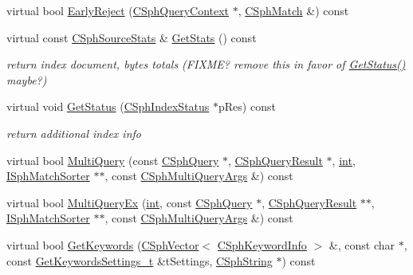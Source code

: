 \begin{DoxyCompactItemize}
virtual bool \hyperlink{classCSphTokenizerIndex_ad6b9616f4afe748c0e35ccc6629b1b74}{Early\-Reject} (\hyperlink{classCSphQueryContext}{C\-Sph\-Query\-Context} $\ast$, \hyperlink{classCSphMatch}{C\-Sph\-Match} \&) const 
\item 
virtual const \hyperlink{structCSphSourceStats}{C\-Sph\-Source\-Stats} \& \hyperlink{classCSphTokenizerIndex_a955dde3307b752ecf39119da3efa170f}{Get\-Stats} () const 
\begin{DoxyCompactList}\small\item\em return index document, bytes totals (F\-I\-X\-M\-E? remove this in favor of \hyperlink{classCSphTokenizerIndex_ad1014ce393721dbd1f7e3600228f8830}{Get\-Status()} maybe?) \end{DoxyCompactList}\item 
virtual void \hyperlink{classCSphTokenizerIndex_ad1014ce393721dbd1f7e3600228f8830}{Get\-Status} (\hyperlink{structCSphIndexStatus}{C\-Sph\-Index\-Status} $\ast$p\-Res) const 
\begin{DoxyCompactList}\small\item\em return additional index info \end{DoxyCompactList}\item 
virtual bool \hyperlink{classCSphTokenizerIndex_a1287c2e4dcf89d2643e8353db9531855}{Multi\-Query} (const \hyperlink{classCSphQuery}{C\-Sph\-Query} $\ast$, \hyperlink{classCSphQueryResult}{C\-Sph\-Query\-Result} $\ast$, \hyperlink{sphinxexpr_8cpp_a4a26e8f9cb8b736e0c4cbf4d16de985e}{int}, \hyperlink{classISphMatchSorter}{I\-Sph\-Match\-Sorter} $\ast$$\ast$, const \hyperlink{structCSphMultiQueryArgs}{C\-Sph\-Multi\-Query\-Args} \&) const 
\item 
virtual bool \hyperlink{classCSphTokenizerIndex_aa00ad3a241c981ba7af81ecb69d45a25}{Multi\-Query\-Ex} (\hyperlink{sphinxexpr_8cpp_a4a26e8f9cb8b736e0c4cbf4d16de985e}{int}, const \hyperlink{classCSphQuery}{C\-Sph\-Query} $\ast$, \hyperlink{classCSphQueryResult}{C\-Sph\-Query\-Result} $\ast$$\ast$, \hyperlink{classISphMatchSorter}{I\-Sph\-Match\-Sorter} $\ast$$\ast$, const \hyperlink{structCSphMultiQueryArgs}{C\-Sph\-Multi\-Query\-Args} \&) const 
\item 
virtual bool \hyperlink{classCSphTokenizerIndex_a3834d22b582826f06e7029ffea9fa98b}{Get\-Keywords} (\hyperlink{classCSphVector}{C\-Sph\-Vector}$<$ \hyperlink{structCSphKeywordInfo}{C\-Sph\-Keyword\-Info} $>$ \&, const char $\ast$, const \hyperlink{structGetKeywordsSettings__t}{Get\-Keywords\-Settings\-\_\-t} \&t\-Settings, \hyperlink{structCSphString}{C\-Sph\-String} $\ast$) const 
$$
\end{DoxyCompactItemize}
